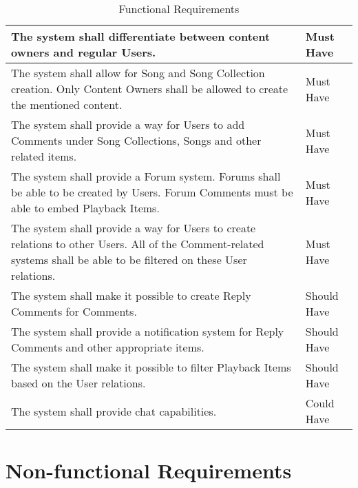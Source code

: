 \begin{table}[h!]
\begin{tabular}{|p{12cm}|p{3cm}|}
        \hline
        The system shall differentiate between content owners and regular Users.                                                                                              & Must Have         \\
        \hline
        The system shall allow for Song and Song Collection creation. Only Content Owners shall be allowed to create the mentioned content. & Must Have\\
        \hline
        The system shall provide a way for Users to add Comments under Song Collections, Songs and other related items. & Must Have \\
        \hline
        The system shall provide a Forum system. Forums shall be able to be created by Users. Forum Comments must be able to embed Playback Items. & Must Have \\
        \hline
        The system shall provide a way for Users to create relations to other Users. All of the Comment-related systems shall be able to be filtered on these User relations. & Must Have \\
        \hline
        The system shall make it possible to create Reply Comments for Comments.                                                                                              & Should Have       \\
        \hline
        The system shall provide a notification system for Reply Comments and other appropriate items.                                                                                              & Should Have       \\
        \hline
        The system shall make it possible to filter Playback Items based on the User relations. & Should Have \\
        \hline
        The system shall provide chat capabilities.                                                                                                                           & Could Have        \\
        \hline
    \end{tabular}
    \caption{Functional Requirements}
\end{table}


\section{Non-functional Requirements}


